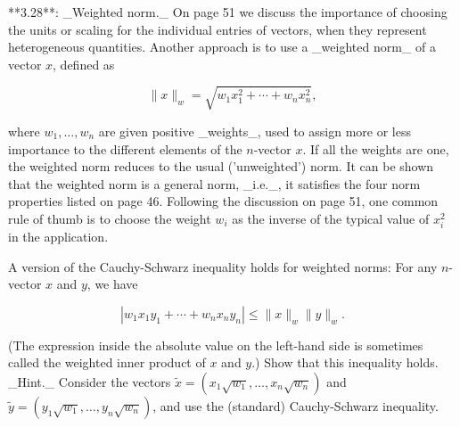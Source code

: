

**3.28**: _Weighted norm._ On page 51 we discuss the importance of choosing the units or scaling for the individual entries of vectors, when they represent heterogeneous quantities. Another approach is to use a _weighted norm_ of a vector \(x\), defined as

\[\|x\|_{w}=\sqrt{w_{1}x_{1}^{2}+\cdots+w_{n}x_{n}^{2}},\]

where \(w_{1},\ldots,w_{n}\) are given positive _weights_, used to assign more or less importance to the different elements of the \(n\)-vector \(x\). If all the weights are one, the weighted norm reduces to the usual ('unweighted') norm. It can be shown that the weighted norm is a general norm, _i.e._, it satisfies the four norm properties listed on page 46. Following the discussion on page 51, one common rule of thumb is to choose the weight \(w_{i}\) as the inverse of the typical value of \(x_{i}^{2}\) in the application.

A version of the Cauchy-Schwarz inequality holds for weighted norms: For any \(n\)-vector \(x\) and \(y\), we have

\[|w_{1}x_{1}y_{1}+\cdots+w_{n}x_{n}y_{n}|\leq\|x\|_{w}\|y\|_{w}.\]

(The expression inside the absolute value on the left-hand side is sometimes called the weighted inner product of \(x\) and \(y\).) Show that this inequality holds. _Hint._ Consider the vectors \(\tilde{x}=(x_{1}\sqrt{w_{1}},\ldots,x_{n}\sqrt{w_{n}})\) and \(\tilde{y}=(y_{1}\sqrt{w_{1}},\ldots,y_{n}\sqrt{w_{n}})\), and use the (standard) Cauchy-Schwarz inequality.


